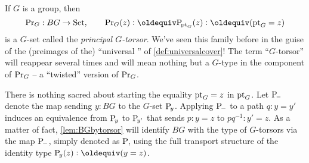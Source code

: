 \begin{example}\label{def:principaltorsor}
  If $G$ is a group, then
$$\princ G:BG\to\Set,\qquad\princ G(z)\defequi\pathsp{\pt_G}(z)\defequi(\pt_G=z)$$ is a $G$-set called the \emph{principal $G$-torsor}.  
We've seen this family before in the guise of the (preimages of the) ``universal \covering'' of \cref{def:universalcover}!  
The term ``$G$-torsor'' will reappear several times and will mean nothing but a $G$-type in the component of $\mathrm{Pr}_{{G}}$ -- a ``twisted'' version of $\mathrm{Pr}_{{G}}$.

There is nothing sacred about starting the equality $\mathrm{pt}_G = z$ in $\mathrm{pt}_G$. 
Let $\mathrm{P}_{\!{-}}$ denote the map sending $y:BG$ to the $G$-set $\mathrm{P}_{\!y}$. 
Applying $\mathrm{P}_{\!{-}}$ to a path $q:y=y'$
induces an equivalence from $\mathrm{P}_{\!y}$ to $\mathrm{P}_{\!y'}$ that sends $p:y=z$ to $pq^{-1}:y'=z$. As a matter of fact, \cref{lem:BGbytorsor} will identify $BG$ with the type of $G$-torsors via the map $\mathrm{P}_{\!{-}}$, simply denoted as $\mathrm{P}_{\!}$,
using the full transport structure of the identity type $\pathsp y(z)\defequi(y=z)$.
 
\end{example}

